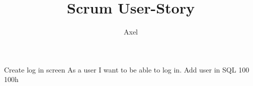 \documentclass{article}
\title{Scrum User-Story}
\author{Axel}
\date{ }
\begin{document}
\maketitle

\begin{backlogcard}
{Create log in screen} %
{As a user I want to be able to log in.} %
{Add user in SQL} %
{100} %
{100h} %
\end{backlogcard}
\end{document}
